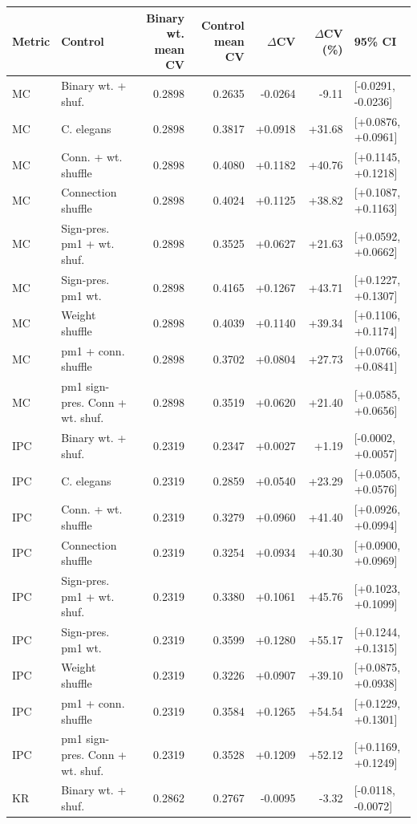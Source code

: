 \begin{tabular}{llrrrrl}
\toprule
Metric & Control & Binary wt. mean CV & Control mean CV & $\Delta$CV & $\Delta$CV (\%) & 95\% CI \\
\midrule
MC & Binary wt. + shuf. & 0.2898 & 0.2635 & -0.0264 & -9.11 & [-0.0291, -0.0236] \\
MC & C. elegans & 0.2898 & 0.3817 & +0.0918 & +31.68 & [+0.0876, +0.0961] \\
MC & Conn. + wt. shuffle & 0.2898 & 0.4080 & +0.1182 & +40.76 & [+0.1145, +0.1218] \\
MC & Connection shuffle & 0.2898 & 0.4024 & +0.1125 & +38.82 & [+0.1087, +0.1163] \\
MC & Sign-pres. pm1 + wt. shuf. & 0.2898 & 0.3525 & +0.0627 & +21.63 & [+0.0592, +0.0662] \\
MC & Sign-pres. pm1 wt. & 0.2898 & 0.4165 & +0.1267 & +43.71 & [+0.1227, +0.1307] \\
MC & Weight shuffle & 0.2898 & 0.4039 & +0.1140 & +39.34 & [+0.1106, +0.1174] \\
MC & pm1 + conn. shuffle & 0.2898 & 0.3702 & +0.0804 & +27.73 & [+0.0766, +0.0841] \\
MC & pm1 sign-pres. Conn + wt. shuf. & 0.2898 & 0.3519 & +0.0620 & +21.40 & [+0.0585, +0.0656] \\
IPC & Binary wt. + shuf. & 0.2319 & 0.2347 & +0.0027 & +1.19 & [-0.0002, +0.0057] \\
IPC & C. elegans & 0.2319 & 0.2859 & +0.0540 & +23.29 & [+0.0505, +0.0576] \\
IPC & Conn. + wt. shuffle & 0.2319 & 0.3279 & +0.0960 & +41.40 & [+0.0926, +0.0994] \\
IPC & Connection shuffle & 0.2319 & 0.3254 & +0.0934 & +40.30 & [+0.0900, +0.0969] \\
IPC & Sign-pres. pm1 + wt. shuf. & 0.2319 & 0.3380 & +0.1061 & +45.76 & [+0.1023, +0.1099] \\
IPC & Sign-pres. pm1 wt. & 0.2319 & 0.3599 & +0.1280 & +55.17 & [+0.1244, +0.1315] \\
IPC & Weight shuffle & 0.2319 & 0.3226 & +0.0907 & +39.10 & [+0.0875, +0.0938] \\
IPC & pm1 + conn. shuffle & 0.2319 & 0.3584 & +0.1265 & +54.54 & [+0.1229, +0.1301] \\
IPC & pm1 sign-pres. Conn + wt. shuf. & 0.2319 & 0.3528 & +0.1209 & +52.12 & [+0.1169, +0.1249] \\
KR & Binary wt. + shuf. & 0.2862 & 0.2767 & -0.0095 & -3.32 & [-0.0118, -0.0072] \\

\end{tabular}
